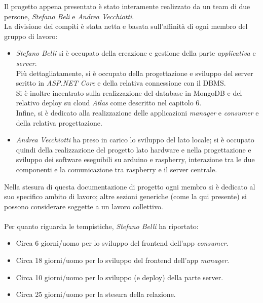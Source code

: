 \documentclass[12pt]{article}
\begin{document}
\newpage
Il progetto appena presentato è stato interamente realizzato da un team di due persone, \textit{Stefano Beli} e \textit{Andrea Vecchiotti}.\\
La divisione dei compiti è stata netta e basata sull'affinità di ogni membro del gruppo di lavoro:
\begin{itemize}
	\item \textit{Stefano Belli} si è occupato della creazione e gestione della parte \textit{applicativa} e \textit{server}.\\
	Più dettagliatamente, si è occupato della progettazione e sviluppo del server scritto in \textit{ASP.NET Core} e della relativa connessione con il DBMS.\\
	Si è inoltre incentrato sulla realizzazione del database in MongoDB e del relativo deploy su cloud \textit{Atlas} come descritto nel capitolo 6.\\
	Infine, si è dedicato alla realizzazione delle applicazioni \textit{manager} e \textit{consumer} e della relativa progettazione.
	\item \textit{Andrea Vecchiotti} ha preso in carico lo sviluppo del lato locale; si è occupato quindi della realizzazione del progetto lato hardware e nella progettazione e sviluppo dei software eseguibili su arduino e raspberry, interazione tra le due componenti e la comunicazione tra raspberry e il server centrale.
\end{itemize}
Nella stesura di questa documentazione di progetto ogni membro si è dedicato al suo specifico ambito di lavoro; altre sezioni generiche (come la qui presente) si possono considerare soggette a un lavoro collettivo.\\\\
Per quanto riguarda le tempistiche, \textit{Stefano Belli}  ha riportato:
\begin{itemize}
\item Circa 6 giorni/uomo per lo sviluppo del frontend dell'app \textit{consumer}.
\item Circa 18 giorni/uomo per lo sviluppo del frontend dell'app \textit{manager}.
\item Circa 10 giorni/uomo per lo sviluppo (e deploy) della parte server.
\item Circa 25 giorni/uomo per la stesura della relazione.
\end{itemize}
\end{document}
